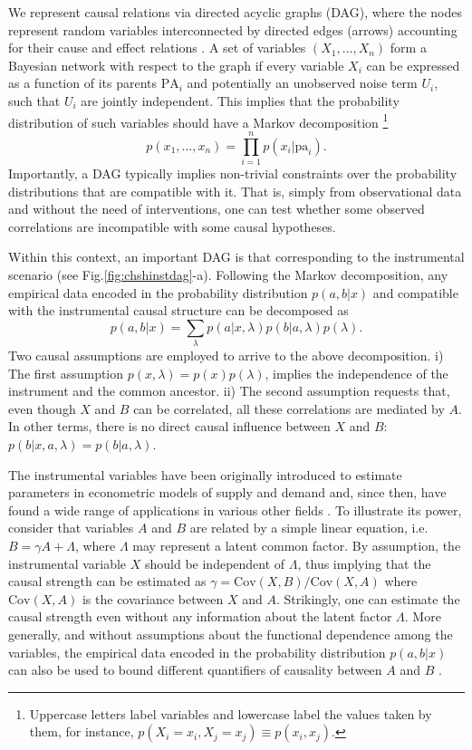 \documentclass[letterpaper]{article}
\newcommand{\PA}{\mathrm{PA}}
\newcommand{\pa}{\mathrm{pa}}
\begin{document}
We represent causal relations via directed acyclic graphs (DAG), where the
nodes represent random variables interconnected by directed edges (arrows)
accounting for their cause and effect relations \cite{pearlbook}.  A set
of variables  $\left( X_1,\dots, X_n \right)$ form a Bayesian network
with respect to the graph if every variable $X_i$ can be expressed as
a function of its parents $\PA_i$ and potentially an unobserved noise
term $U_i$, such that $U_i$ are jointly independent. This implies that
the probability distribution of such variables should have a Markov
decomposition
\footnote{Uppercase letters label variables and lowercase label the values
taken by them, for instance, $p(X_i =x_i, X_j = x_j) \equiv p(x_i, x_j)$.}
\begin{equation}
p(x_1,\dots,x_n)= \prod_{i=1}^{n} p(x_i \vert \pa_i).    
\end{equation}
Importantly, a DAG typically implies non-trivial constraints over
the probability distributions that are compatible with it. That is,
simply from observational data and without the need of interventions,
one can test whether some observed correlations are incompatible with
some causal hypotheses.

Within this context, an important DAG is that corresponding to the instrumental
scenario (see Fig.\ref{fig:chshinstdag}-a). Following the Markov decomposition, any
empirical data encoded in the probability distribution $p(a,b \vert x)$ and
compatible with the instrumental causal structure can be decomposed as
\begin{equation}
p(a,b \vert x) = \sum_{\lambda} p(a\vert x,\lambda) p(b\vert a,\lambda)p(\lambda).
\end{equation}
Two causal assumptions are employed to arrive to the above
decomposition. i) The first assumption $p(x,\lambda)=p(x)p(\lambda)$,
implies the independence of the instrument and the common ancestor. ii)
The second assumption requests that, even though $X$ and $B$ can be
correlated, all these correlations are mediated by $A$. In other terms,
there is no direct causal influence between $X$ and $B$: $p(b\vert
x,a,\lambda)=p(b\vert a,\lambda)$.

The instrumental variables have been originally introduced to estimate
parameters in econometric models of supply and demand \cite{economic}
and, since then, have found a wide range of applications in various other
fields \cite{economic2, economic3}. To illustrate its power, consider
that variables $A$ and $B$ are related by a simple linear equation,
i.e. $B=\gamma A +\Lambda$, where $\Lambda$ may represent a latent
common factor. By assumption, the instrumental variable $X$ should be
independent of $\Lambda$, thus implying that the causal strength can
be estimated as $\gamma= \mathrm{Cov}(X,B)/\mathrm{Cov}(X,A)$ where
$\mathrm{Cov}(X,A)$ is the covariance between $X$ and $A$. Strikingly,
one can estimate the causal strength even without any information about
the latent factor $\Lambda$. More generally, and without assumptions
about the functional dependence among the variables, the empirical data
encoded in the probability distribution $p(a,b \vert x)$ can also be
used to bound different quantifiers of causality between $A$ and $B$
\cite{pearlbook,Janzing2013}.
\end{document}
